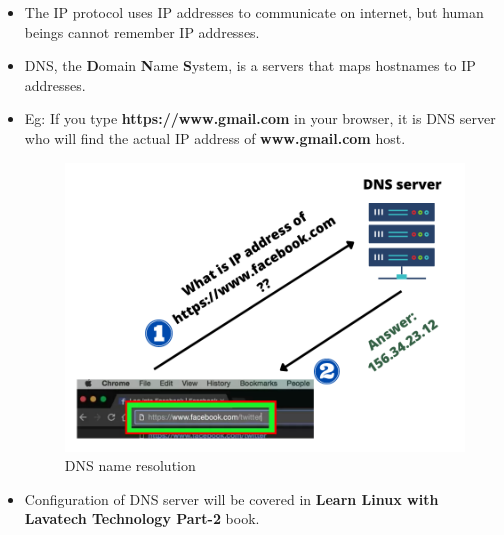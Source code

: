 \setlength{\columnsep}{3pt}
\begin{flushleft}
	\bigskip
	\begin{itemize}
		\begin{itemize}
			\item The IP protocol uses IP addresses to communicate on internet, but human beings cannot remember IP addresses. 
			\item DNS, the \textbf{D}omain \textbf{N}ame \textbf{S}ystem, is a servers that maps hostnames to IP addresses. 
			\item Eg: If you type \textbf{https://www.gmail.com} in your browser, it is DNS server who will find the actual IP address of \textbf{www.gmail.com} host.
			\begin{figure}[h!]
				\centering
				\includegraphics[scale=0.45]{content/chapter14/images/dns.png}
				\caption{DNS name resolution}
				\label{fig:severity26}
			\end{figure}			
			\item Configuration of DNS server will be covered in \textbf{Learn Linux with Lavatech Technology Part-2} book.
		\end{itemize}
	\end{itemize}
	
 \end{flushleft}
\newpage


